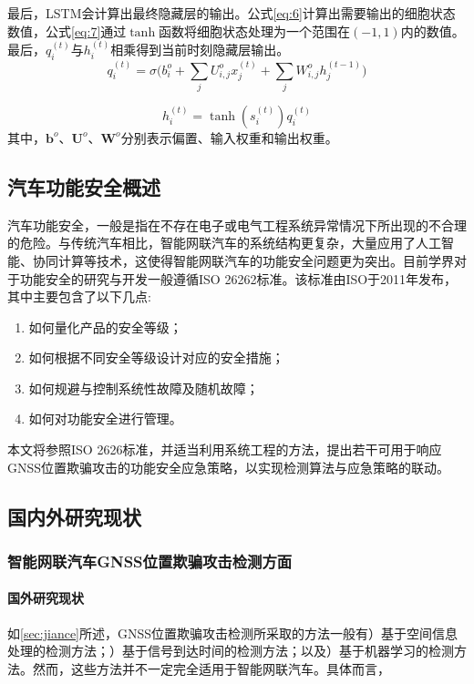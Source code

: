 最后，LSTM会计算出最终隐藏层的输出。公式\ref{eq:6}计算出需要输出的细胞状态数值，公式\ref{eq:7}通过$\tanh$函数将细胞状态处理为一个范围在$(-1,1)$内的数值。最后，$q_i^{(t)}$与$h_i^{(t)}$相乘得到当前时刻隐藏层输出。
\begin{equation}
    q_i^{(t)}=\sigma\bigg(b_i^o+\sum_jU^o_{i,j}x_j^{(t)}+\sum_jW_{i,j}^oh_j^{(t-1)}\bigg)
    \label{eq:6}
\end{equation}

\begin{equation}
    h_i^{(t)}=\tanh(s_i^{(t)})q_i^{(t)}
    \label{eq:7}
\end{equation}
其中，$\textbf{b}^o$、$\textbf{U}^o$、$\textbf{W}^o$分别表示偏置、输入权重和输出权重。

\subsection{汽车功能安全概述}
汽车功能安全，一般是指在不存在电子或电气工程系统异常情况下所出现的不合理的危险\cite{刘法旺2021自动驾驶系统功能安全与预期功能安全研究}。与传统汽车相比，智能网联汽车的系统结构更复杂，大量应用了人工智能、协同计算等技术，这使得智能网联汽车的功能安全问题更为突出。目前学界对于功能安全的研究与开发一般遵循ISO 26262标准。该标准由ISO于2011年发布，其中主要包含了以下几点\cite{iso_2018}:
\begin{enumerate}
    \item 如何量化产品的安全等级；
    \item 如何根据不同安全等级设计对应的安全措施；
    \item 如何规避与控制系统性故障及随机故障；
    \item 如何对功能安全进行管理。
\end{enumerate}
本文将参照ISO 2626标准，并适当利用系统工程的方法，提出若干可用于响应GNSS位置欺骗攻击的功能安全应急策略，以实现检测算法与应急策略的联动。

\subsection{国内外研究现状}
\subsubsection{智能网联汽车GNSS位置欺骗攻击检测方面}
\paragraph{国外研究现状}
\label{国外研究现状GNSS_guowai}
如\ref{sec:jiance}所述，GNSS位置欺骗攻击检测所采取的方法一般有）基于空间信息处理的检测方法；）基于信号到达时间的检测方法；以及）基于机器学习的检测方法。然而，这些方法并不一定完全适用于智能网联汽车。具体而言，

